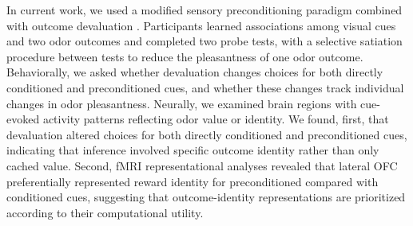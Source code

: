 \documentclass[12pt,letterpaper]{article}
\begin{document}
In current work, we used a modified sensory preconditioning \cite{Brogden39} paradigm combined with outcome devaluation \cite{HowRey2020,liu2025distinct}. Participants learned associations among visual cues and two odor outcomes and completed two probe tests, with a selective satiation procedure between tests to reduce the pleasantness of one odor outcome. Behaviorally, we asked whether devaluation changes choices for both directly conditioned and preconditioned cues, and whether these changes track individual changes in odor pleasantness. Neurally, we examined brain regions with cue-evoked activity patterns reflecting odor value or identity. We found, first, that devaluation altered choices for both directly conditioned and preconditioned cues, indicating that inference involved specific outcome identity rather than only cached value. Second, fMRI representational analyses revealed that lateral OFC preferentially represented reward identity for preconditioned compared with conditioned cues, suggesting that outcome-identity representations are prioritized according to their computational utility.






\par\bigskip\begingroup
{}
\end{document}

